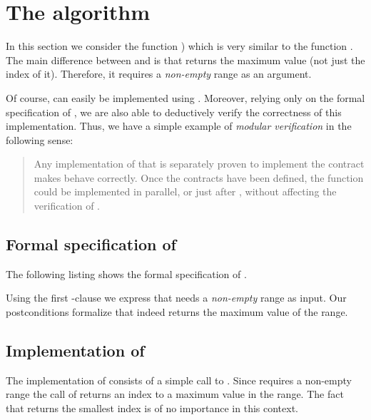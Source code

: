 
\section{The \maxseq algorithm}

In this section we consider the function \maxseq \cite[Ch.~3]{ACSLTutorial})
which is very similar to the function .
The main difference between \maxseq and \maxelement is that
\maxseq returns the maximum value (not just the index of it).
Therefore, it requires a \emph{non-empty} range as an argument.

Of course, \maxseq can easily be implemented using .
Moreover, relying only on the formal specification of ,
we are also able to deductively verify the correctness of this implementation.
Thus, we have a simple example of \emph{modular verification} in the following sense:
\begin{quote}
Any implementation of \maxelementii that is separately
 proven to implement the contract 
 makes \maxseq behave correctly.
 Once the contracts have been defined, the function \maxelementii
 could be implemented in parallel, or just after \maxseq,
 without affecting the verification of \maxseq.
\end{quote}


\subsection{Formal specification of \maxseq}

The following listing shows the formal specification of .



Using the first -clause we express that \maxseq needs a \emph{non-empty} range as input.
Our postconditions
formalize that \maxseq indeed returns the maximum value of the range.


\subsection{Implementation of \maxseq}

The implementation of  consists of a simple call to .
Since \maxseq requires a non-empty range the call of \maxelementii
returns an index to a maximum value in the range.
The fact that \maxelementii returns the smallest index is of no importance
in this context.



\clearpage


